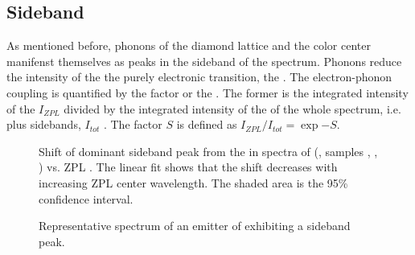 


	\subsection{Sideband} \label{subsubsec::sideband}

		As mentioned before, phonons of the diamond lattice and the color center manifenst themselves as peaks in the sideband of the \pl spectrum.
		Phonons reduce the intensity of the the purely electronic transition, the \zpl.
		The electron-phonon coupling is quantified by the \db factor or the \hr.
		The former is the integrated intensity of the \zpl $I_{ZPL}$ divided by the integrated intensity of the \pl of the whole spectrum, i.e. \ZPL plus sidebands, $I_{tot}$ \cite{Neu2014,Gaebel2004}.
		The \hr factor $S$ is defined as $I_{ZPL}/I_{tot}=\exp{-S}$.


		\begin{figure}[tp]
			\centering
			\caption{Shift of dominant sideband peak from the \ZPL in spectra of \sivs (\vl, samples \insituF, \insituS, \insituH) vs. ZPL \cwl. The linear fit shows that the shift decreases with increasing ZPL center wavelength. The shaded area is the 95\% confidence interval.}
			\label{fig::sideband_fit}
		\end{figure}

		\begin{figure}[tp]
			\centering
			\caption{Representative spectrum of an emitter of \vl exhibiting a sideband peak.}
			\label{fig::broad_peak_sb}
		\end{figure}

